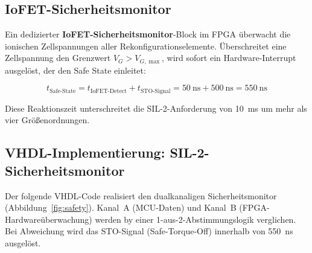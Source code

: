 ﻿\documentclass[a4paper,12pt]{scrreprt}
\theoremstyle{definition}
\begin{document}
\subsection{IoFET-Sicherheitsmonitor}

Ein dedizierter \textbf{IoFET-Sicherheitsmonitor}-Block im FPGA
überwacht die ionischen Zellspannungen aller Rekonfigurationselemente.
Überschreitet eine Zellspannung den Grenzwert $V_G > V_{G,\max}$,
wird sofort ein Hardware-Interrupt ausgelöst, der den Safe State
einleitet:

\begin{equation}
  t_{\text{Safe-State}} = t_{\text{IoFET-Detect}} + t_{\text{STO-Signal}}
  = \SI{50}{\nano\second} + \SI{500}{\nano\second}
  = \SI{550}{\nano\second}
\end{equation}

Diese Reaktionszeit unterschreitet die SIL-2-Anforderung von
\SI{10}{\milli\second} um mehr als vier Größenordnungen.

\subsection{VHDL-Implementierung: SIL-2-Sicherheitsmonitor}

Der folgende VHDL-Code realisiert den dualkanaligen Sicherheitsmonitor
(Abbildung~\ref{fig:safety}). Kanal~A (MCU-Daten) und Kanal~B
(FPGA-Hardwareüberwachung) werden by einer 1-aus-2-Abstimmungslogik
verglichen. Bei Abweichung wird das STO-Signal (Safe-Torque-Off)
innerhalb von \SI{550}{\nano\second} ausgelöst.
\end{document}
